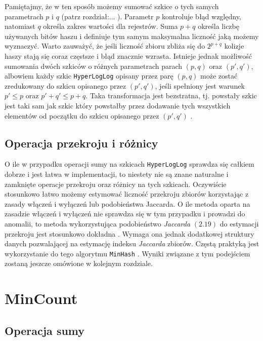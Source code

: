 Pamiętajmy, że w ten sposób możemy sumować szkice o tych samych parametrach $p$ i $q$ (patrz rozdział:... ). Parametr $p$ kontroluje błąd względny, natomiast $q$ określa zakres wartości dla rejestrów. Suma $p + q$ określa liczbę używanych bitów haszu i definiuje tym samym maksymalna liczność jaką możemy wyznaczyć. Warto zauważyć, że jeśli liczność zbioru zbliża się do $2^{p+q}$ kolizje haszy stają się coraz częstsze i błąd znacznie wzrasta. Istnieje jednak możliwość sumowania dwóch szkiców o różnych parametrach parach $(p, q)$ oraz $(p',q')$, albowiem każdy szkic \texttt{HyperLogLog} opisany przez parę $(p, q)$ może zostać zredukowany do szkicu opisanego przez $(p', q')$, jeśli spełniony jest warunek $p' \leq p$ oraz $p' + q' \leq p + q$. Taka transformacja jest bezstratna, tj. powstały szkic jest taki sam jak szkic który powstałby przez dodawanie tych wszystkich elementów od początku do szkicu opisanego przez $(p', q')$ \cite{oertl}.

\subsection{Operacja przekroju i różnicy}

O ile w przypadku operacji sumy na szkicach \texttt{HyperLogLog} sprawdza się całkiem dobrze i jest  łatwa w implementacji, to niestety nie są znane naturalne i zamknięte operacje przekroju oraz różnicy na tych szkicach. Oczywiście stosunkowo łatwo możemy estymować liczność przekroju zbiorów korzystając z zasady włączeń i wyłączeń lub podobieństwa Jaccarda.
O ile metoda oparta na zasadzie włączeń i wyłączeń nie sprawdza się w tym przypadku i prowadzi do anomalii, to metoda wykorzystująca podobieństwo \textit{Jaccarda} $(2.19)$  do estymacji przekroju jest stosunkowo dokładna . Wymaga ona jednak dodatkowej struktury danych pozwalającej na estymację indeksu \textit{Jaccarda} zbiorów. Częstą praktyką jest wykorzystanie do tego algorytmu \texttt{MinHash} \cite{adroll}. Wyniki związane z tym podejściem zostaną jeszcze omówione w kolejnym rozdziale.

\section{MinCount}

\subsection{Operacja sumy}

